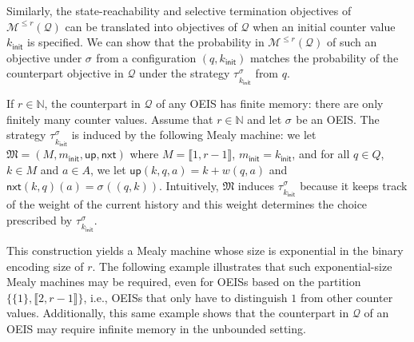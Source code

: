 \documentclass[a4paper,UKenglish,cleveref,autoref,thm-restate,colorlinks]{lipics-v2021}
\newcommand{\init}{\mathsf{init}}
\newcommand{\integerInterval}[1]{\llbracket{}#1\rrbracket{}}
\newcommand{\IN}{\mathbb{N}}
\newcommand{\mdp}{\mathcal{M}}
\newcommand{\weight}{w}
\newcommand{\ocmdp}{\mathcal{Q}}
\newcommand{\ocmdpFin}[2]{\mdp^{\leq #2}(#1)}
\newcommand{\ocStateSpace}{Q}
\newcommand{\ocState}{q}
\newcommand{\ocCount}{k}
\newcommand{\ocActionSpace}{A}
\newcommand{\ocAction}{a}
\newcommand{\counterUB}{r}
\newcommand{\mealy}{\mathfrak{M}}
\newcommand{\mealyStateSpace}{M}
\newcommand{\mealyState}{m}
\newcommand{\mealyStateInit}{\mealyState_\init}
\newcommand{\mealyUpdate}{\mathsf{up}}
\newcommand{\mealyNext}{\mathsf{nxt}}
\newcommand{\mealyTuple}{(\mealyStateSpace, \mealyStateInit, \mealyUpdate, \mealyNext)}
\newcommand{\stratGeneric}[1]{{\sigma_{#1}}}
\newcommand{\strat}{\stratGeneric{}}
\newcommand{\stratBGeneric}[1]{{\tau_{#1}}}
\newcommand{\stratB}{\stratBGeneric{}}
\begin{document}
Similarly, the state-reachability and selective termination objectives of $\ocmdpFin{\ocmdp}{\counterUB}$ can be translated into objectives of $\ocmdp$ when an initial counter value $\ocCount_\init$ is specified. 
We can show that the probability in $\ocmdpFin{\ocmdp}{\counterUB}$ of such an objective under $\strat$ from a configuration $(\ocState, \ocCount_\init)$ matches the probability of the counterpart objective in $\ocmdp$ under the strategy $\stratB^{\strat}_{\ocCount_\init}$ from $\ocState$.


If $\counterUB\in\IN$, the counterpart in $\ocmdp$ of any OEIS has finite memory: there are only finitely many counter values.
Assume that $\counterUB\in\IN$ and let $\strat$ be an OEIS.
The strategy $\stratB^{\strat}_{\ocCount_\init}$ is induced by the following Mealy machine: we let $\mealy = \mealyTuple$ where $\mealyStateSpace = \integerInterval{1, \counterUB -1}$, $\mealyStateInit = \ocCount_\init$, and for all $\ocState\in\ocStateSpace$, $\ocCount\in\mealyStateSpace$ and $\ocAction\in\ocActionSpace$, we let $\mealyUpdate(\ocCount, \ocState, \ocAction) = \ocCount + \weight(\ocState, \ocAction)$ and $\mealyNext(\ocCount, \ocState)(\ocAction) = \strat((\ocState, \ocCount))$.
Intuitively, $\mealy$ induces $\stratB^{\strat}_{\ocCount_\init}$ because it keeps track of the weight of the current history and this weight determines the choice prescribed by $\stratB^{\strat}_{\ocCount_\init}$.

This construction yields a Mealy machine whose size is exponential in the binary encoding size of $\counterUB$.
The following example illustrates that such exponential-size Mealy machines may be required, even for OEISs based on the partition $\{\{1\}, \integerInterval{2, \counterUB-1}\}$, i.e., OEISs that only have to distinguish $1$ from other counter values.
Additionally, this same example shows that the counterpart in $\ocmdp$ of an OEIS may require infinite memory in the unbounded setting.
\end{document}
